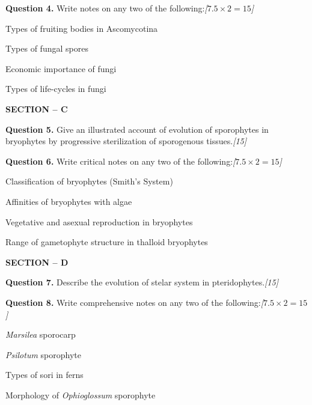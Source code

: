 \documentclass[11pt,a4paper]{article}
\newcommand{\pts}[1]{\hfill   \textit{[#1]}}
\begin{document}
\medskip


\noindent   \textbf{Question 4.} Write notes on any two of the following:\pts{$7.5  \times 2 = 15$}

\begin{parts}
  \item Types of fruiting bodies in Ascomycotina
  \item Types of fungal spores
  \item Economic importance of fungi
  \item Types of life-cycles in fungi
\end{parts}

\bigskip

\begin{center}
   \textbf{SECTION -- C}
\end{center}

\medskip


\noindent   \textbf{Question 5.} Give an illustrated account of evolution of sporophytes in bryophytes by progressive sterilization of sporogenous tissues.\pts{15}

\medskip


\noindent   \textbf{Question 6.} Write critical notes on any two of the following:\pts{$7.5  \times 2 = 15$}

\begin{parts}
  \item Classification of bryophytes (Smith's System)
  \item Affinities of bryophytes with algae
  \item Vegetative and asexual reproduction in bryophytes
  \item Range of gametophyte structure in thalloid bryophytes
\end{parts}

\bigskip

\begin{center}
   \textbf{SECTION -- D}
\end{center}

\medskip


\noindent   \textbf{Question 7.} Describe the evolution of stelar system in pteridophytes.\pts{15}

\medskip


\noindent   \textbf{Question 8.} Write comprehensive notes on any two of the following:\pts{$7.5  \times 2 = 15$}

\begin{parts}
  \item   \textit{Marsilea} sporocarp
  \item   \textit{Psilotum} sporophyte
  \item Types of sori in ferns
  \item Morphology of   \textit{Ophioglossum} sporophyte
\end{parts}
\end{document}
